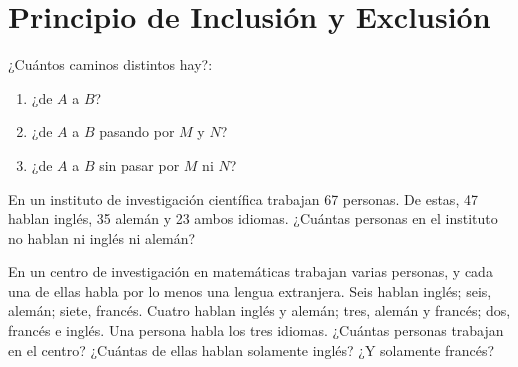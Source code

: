 \newpage 

\section{Principio de Inclusión y Exclusión}

\begin{ejercicio}
¿Cuántos caminos distintos hay?:
\begin{enumerate}
    \item ¿de $A$ a $B$?
    \item ¿de $A$ a $B$ pasando por $M$ y $N$?
    \item ¿de $A$ a $B$ sin pasar por $M$ ni $N$?
\end{enumerate}
\begin{center}
\end{center}
\end{ejercicio}
\newpage

\begin{ejercicio}
En un instituto de investigación científica trabajan 67 personas. De estas, 47
hablan inglés, 35 alemán y 23 ambos idiomas. ¿Cuántas personas en el instituto no hablan ni inglés ni alemán?
\end{ejercicio}

\begin{ejercicio}
En un centro de investigación en matemáticas trabajan varias personas, y cada
una de ellas habla por lo menos una lengua extranjera. Seis hablan inglés; seis, alemán; siete, francés. Cuatro hablan inglés y alemán; tres, alemán y francés; dos, francés e inglés. Una persona habla los tres idiomas. 
¿Cuántas personas trabajan en el centro? ¿Cuántas de ellas hablan solamente inglés?
¿Y solamente francés?
\end{ejercicio}


